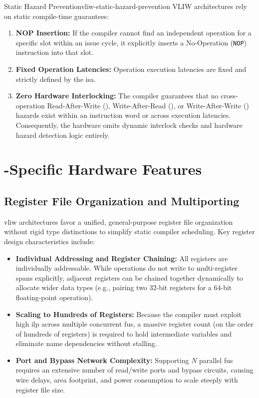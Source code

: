 \begin{concept}{Static Hazard Prevention}{vliw-static-hazard-prevention}
    VLIW architectures rely on static compile-time guarantees:
    \begin{enumerate}
        \item \textbf{NOP Insertion:} If the compiler cannot find an independent operation for a specific slot within an issue cycle, it explicitly inserts a No-Operation (\texttt{NOP}) instruction into that slot.
        \item \textbf{Fixed Operation Latencies:} Operation execution latencies are fixed and strictly defined by the \gls{isa}.
        \item \textbf{Zero Hardware Interlocking:} The compiler guarantees that no cross-operation Read-After-Write (), Write-After-Read (), or Write-After-Write () hazards exist within an instruction word or across execution latencies. Consequently, the hardware omits dynamic interlock checks and hardware hazard detection logic entirely.
    \end{enumerate}
\end{concept}

\section{-Specific Hardware Features}
\label{sec:vliw_hardware_features}

\subsection{Register File Organization and Multiporting}

\gls{vliw} architectures favor a unified, general-purpose register file organization without rigid type distinctions to simplify static compiler scheduling. Key register design characteristics include:

\begin{itemize}
    \item \textbf{Individual Addressing and Register Chaining:} All registers are individually addressable. While operations do not write to multi-register spans explicitly, adjacent registers can be chained together dynamically to allocate wider data types (e.g., pairing two 32-bit registers for a 64-bit floating-point operation).
    \item \textbf{Scaling to Hundreds of Registers:} Because the compiler must exploit high \gls{ilp} across multiple concurrent \glspl{fu}, a massive register count (on the order of hundreds of registers) is required to hold intermediate variables and eliminate name dependencies without stalling.
    \item \textbf{Port and Bypass Network Complexity:} Supporting $N$ parallel \glspl{fu} requires an extensive number of read/write ports and bypass circuits, causing wire delays, area footprint, and power consumption to scale steeply with register file size.
\end{itemize}

